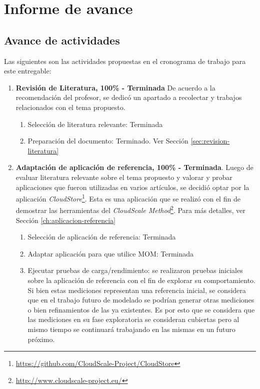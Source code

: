 \documentclass[11pt, twoside]{report}
\begin{document}
\chapter{Informe de avance}

\section{Avance de actividades}
Las siguientes son las actividades propuestas en el cronograma de trabajo para este entregable:
\begin{enumerate}
    \item \textbf{Revisión de Literatura, 100\% - Terminada} De acuerdo a la recomendación del profesor, se dedicó un apartado a recolectar y trabajos relacionados con el tema propuesto.
    \begin{enumerate}
        \item Selección de literatura relevante: Terminada
        \item Preparación del documento: Terminado. Ver Sección \ref{sec:revision-literatura}
    \end{enumerate}
    \item \textbf{Adaptación de aplicación de referencia, 100\% - Terminada}. Luego de evaluar literatura relevante sobre el tema propuesto y valorar y probar aplicaciones que fueron utilizadas en varios artículos, se decidió optar por la aplicación \emph{CloudStore}\footnote{\url{https://github.com/CloudScale-Project/CloudStore}}. Esta es una aplicación que se realizó con el fin de demostrar las herramientas del \emph{CloudScale Method}\footnote{\url{http://www.cloudscale-project.eu/}}. Para más detalles, ver Sección \ref{ch:aplicacion-referencia}
    \begin{enumerate}
        \item Selección de aplicación de referencia: Terminada
        \item Adaptar aplicación para que utilice MOM: Terminada
        \item Ejecutar pruebas de carga/rendimiento: se realizaron pruebas iniciales sobre la aplicación de referencia con el fin de explorar su comportamiento. Si bien estas mediciones representan una referencia inicial, se considera que en el trabajo futuro de modelado se podrían generar otras mediciones o bien refinamientos de las ya existentes. Es por esto que se considera que las mediciones en su fase exploratoria se consideran cubiertas pero al mismo tiempo se continuará trabajando en las mismas en un futuro próximo.
    \end{enumerate}
\end{enumerate}
\end{document}
